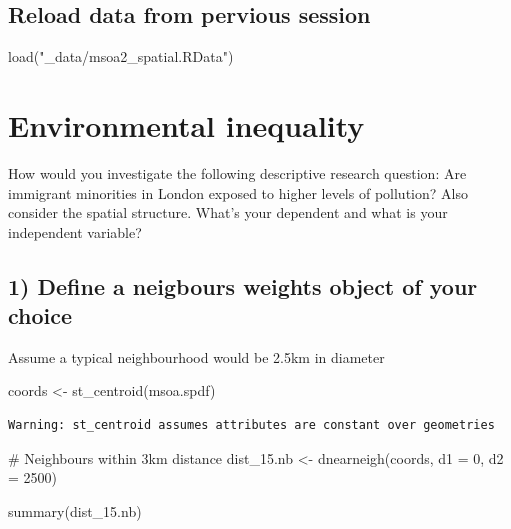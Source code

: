 \documentclass[
  letterpaper,
]{scrbook}
\newenvironment{Shaded}{\begin{snugshade}}{\end{snugshade}}
\newcommand{\AttributeTok}[1]{\textcolor[rgb]{0.40,0.45,0.13}{#1}}
\newcommand{\CommentTok}[1]{\textcolor[rgb]{0.37,0.37,0.37}{#1}}
\newcommand{\DecValTok}[1]{\textcolor[rgb]{0.68,0.00,0.00}{#1}}
\newcommand{\FunctionTok}[1]{\textcolor[rgb]{0.28,0.35,0.67}{#1}}
\newcommand{\NormalTok}[1]{\textcolor[rgb]{0.00,0.23,0.31}{#1}}
\newcommand{\OtherTok}[1]{\textcolor[rgb]{0.00,0.23,0.31}{#1}}
\newcommand{\StringTok}[1]{\textcolor[rgb]{0.13,0.47,0.30}{#1}}
\begin{document}
\hypertarget{reload-data-from-pervious-session-6}{%
\subsection*{Reload data from pervious
session}\label{reload-data-from-pervious-session-6}}

\begin{Shaded}
\begin{Highlighting}[]
\FunctionTok{load}\NormalTok{(}\StringTok{"\_data/msoa2\_spatial.RData"}\NormalTok{)}
\end{Highlighting}
\end{Shaded}

\hypertarget{environmental-inequality}{%
\section{Environmental inequality}\label{environmental-inequality}}

How would you investigate the following descriptive research question:
Are immigrant minorities in London exposed to higher levels of
pollution? Also consider the spatial structure. What's your dependent
and what is your independent variable?

\hypertarget{define-a-neigbours-weights-object-of-your-choice}{%
\subsection*{1) Define a neigbours weights object of your
choice}\label{define-a-neigbours-weights-object-of-your-choice}}

Assume a typical neighbourhood would be 2.5km in diameter

\begin{Shaded}
\begin{Highlighting}[]
\NormalTok{coords }\OtherTok{\textless{}{-}} \FunctionTok{st\_centroid}\NormalTok{(msoa.spdf)}
\end{Highlighting}
\end{Shaded}

\begin{verbatim}
Warning: st_centroid assumes attributes are constant over geometries
\end{verbatim}

\begin{Shaded}
\begin{Highlighting}[]
\CommentTok{\# Neighbours within 3km distance}
\NormalTok{dist\_15.nb }\OtherTok{\textless{}{-}} \FunctionTok{dnearneigh}\NormalTok{(coords, }\AttributeTok{d1 =} \DecValTok{0}\NormalTok{, }\AttributeTok{d2 =} \DecValTok{2500}\NormalTok{)}

\FunctionTok{summary}\NormalTok{(dist\_15.nb)}
\end{Highlighting}
\end{Shaded}
\end{document}
